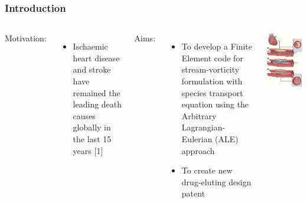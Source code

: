\begin{frame}
\frametitle{Introduction}
\vspace{-1.1cm}
\begin{columns}[c]
Motivation:
\begin{itemize}
  \justifying
  \item Ischaemic heart disease and stroke have remained the leading death causes globally in the last 15 years [1]
\end{itemize}
 
\vspace{0.5cm}
 
Aims:
\begin{itemize}
 \justifying
 \item To develop a Finite Element code for stream-vorticity formulation 
       with species transport equation using the Arbitrary Lagrangian-Eulerian (ALE) approach \\


 \vspace{0.2cm}
 \item To create new drug-eluting design patent 

\end{itemize}
\begin{center}
  \includegraphics[scale=0.38]{images/stent_bare.jpg}
\end{center}
\end{columns}


\end{frame}
